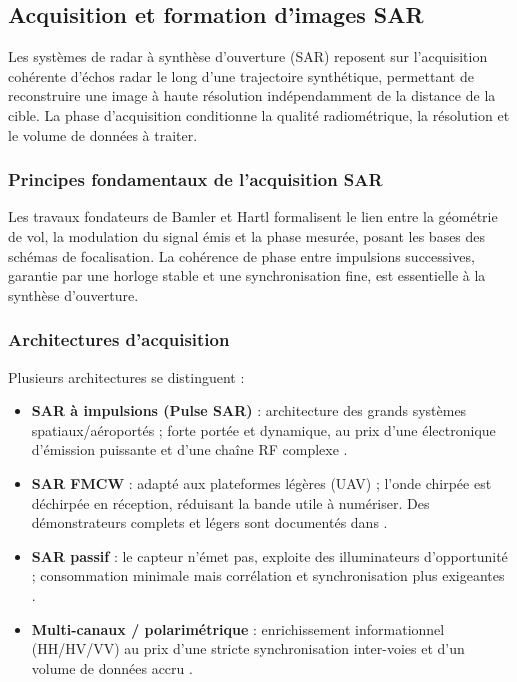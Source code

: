 \subsection{Acquisition et formation d'images SAR}

Les systèmes de radar à synthèse d'ouverture (SAR) reposent sur l'acquisition cohérente d'échos radar le long d'une trajectoire synthétique, permettant de reconstruire une image à haute résolution indépendamment de la distance de la cible. La phase d'acquisition conditionne la qualité radiométrique, la résolution et le volume de données à traiter.

\subsubsection{Principes fondamentaux de l’acquisition SAR}

Les travaux fondateurs de Bamler et Hartl \cite{Bamler1993_SAR} formalisent le lien entre la géométrie de vol, la modulation du signal émis et la phase mesurée, posant les bases des schémas de focalisation. La cohérence de phase entre impulsions successives, garantie par une horloge stable et une synchronisation fine, est essentielle à la synthèse d’ouverture.

\subsubsection{Architectures d’acquisition}

Plusieurs architectures se distinguent :
\begin{itemize}
  \item \textbf{SAR à impulsions (Pulse SAR)} : architecture des grands systèmes spatiaux/aéroportés ; forte portée et dynamique, au prix d’une électronique d’émission puissante et d’une chaîne RF complexe \cite{Krieger2010_InterferometricSAR}.
  \item \textbf{SAR FMCW} : adapté aux plateformes légères (UAV) ; l’onde chirpée est déchirpée en réception, réduisant la bande utile à numériser. Des démonstrateurs complets et légers sont documentés dans \cite{Aguasca2013_ARBRES_UAV_SAR,Svedin2021_UAVSAR}.
  \item \textbf{SAR passif} : le capteur n’émet pas, exploite des illuminateurs d’opportunité ; consommation minimale mais corrélation et synchronisation plus exigeantes \cite{Sun2020_PassiveUAVSAR}.
  \item \textbf{Multi-canaux / polarimétrique} : enrichissement informationnel (HH/HV/VV) au prix d’une stricte synchronisation inter-voies et d’un volume de données accru \cite{Krieger2010_InterferometricSAR}.
\end{itemize}

